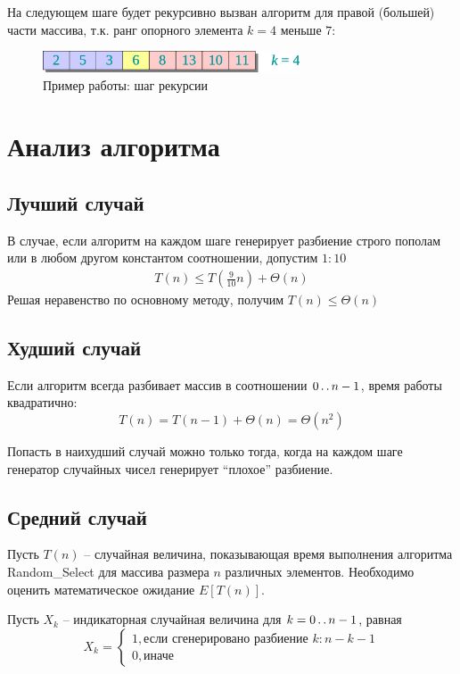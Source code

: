 \documentclass[11pt]{article}
\begin{document}
На следующем шаге будет рекурсивно вызван алгоритм для правой (большей) части массива, т.к. ранг опорного элемента $k=4$ меньше $7$:
\begin{figure}[ht]
  \centering
  \includegraphics[width=3in]{lecture6/example2.eps}
  \caption{Пример работы: шаг рекурсии}
  \label{fig:example2}
\end{figure}

\section{Анализ алгоритма}
\subsection{Лучший случай}
В случае, если алгоритм на каждом шаге генерирует разбиение строго пополам или в любом другом константом соотношении, допустим $1{:}10$
\begin{align*}
  T(n) \leqslant T(\frac{9}{10}n) + \Theta(n)
\end{align*}
Решая неравенство по основному методу, получим $T(n) \leqslant \Theta(n)$

\subsection{Худший случай}
Если алгоритм всегда разбивает массив в соотношении $0 \mathinner{\ldotp\ldotp} n-1$, время работы квадратично:
\begin{equation*}
  T(n) = T(n-1) + \Theta(n) = \Theta(n^2)
\end{equation*}

Попасть в наихудший случай можно только тогда, когда на каждом шаге генератор случайных чисел генерирует ``плохое'' разбиение.

\subsection{Средний случай}
Пусть $T(n)$ -- случайная величина, показывающая время выполнения алгоритма Random\_Select для массива размера $n$ различных элементов. Необходимо оценить математическое ожидание $E[T(n)]$.

Пусть $X_k$ -- индикаторная случайная величина для $k = 0 \mathinner{\ldotp\ldotp} n-1$, равная
\begin{equation*}
  X_k = \begin{cases}
      1, \text{если сгенерировано разбиение } k:n-k-1 \\
      0, \text{иначе}
  \end{cases}
\end{equation*}
\end{document}
